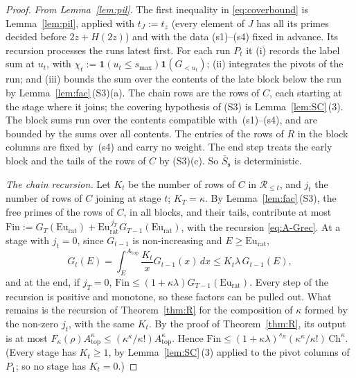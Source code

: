 \begin{proof}
\emph{From Lemma~\ref{lem:pil}.} The first inequality in \eqref{eq:coverbound} is Lemma~\ref{lem:pil}, applied with
$t_J:=t_z$ (every element of $J$ has all its primes decided before $2z+H(2z)$) and with the data (s1)--(s4) fixed in
advance. Its recursion processes the runs latest first. For each run $P_t$ it (i) records the label sum at $u_t$, with
$\chi_t:=\mathbf 1(u_t\le s_{\max})\mathbf 1(G_{<u_t})$; (ii) integrates the pivots of the run; and (iii) bounds the sum
over the contents of the late block below the run by Lemma~\ref{lem:fac}\,(S3)(a). The chain rows are the rows of $C$,
each starting at the stage where it joins; the covering hypothesis of (S3) is Lemma~\ref{lem:SC}\,(3). The block sums
run over the contents compatible with~(s1)--(s4), and are bounded by the sums over all contents. The entries of the rows
of $R$ in the block columns are fixed by~(s4) and carry no weight. The end step treats the early block and the tails of
the rows of $C$ by (S3)(c). So $\bar S_{\mathfrak s}$ is deterministic.

\emph{The chain recursion.} Let $K_t$ be the number of rows of $C$ in $\mathcal R_{\le t}$, and $j_t$ the number of rows of
$C$ joining at stage $t$; $K_T=\kappa$. By Lemma~\ref{lem:fac}\,(S3), the free primes of the rows of $C$, in all blocks,
and their tails, contribute at most $\mathrm{Fin}:=G_T(\mathrm{Eu}_{\mathrm{rat}})+\mathrm{Eu}_{\mathrm{rat}}^{\,j_T}
G_{T-1}(\mathrm{Eu}_{\mathrm{rat}})$, with the recursion \eqref{eq:A-Grec}. At a stage with $j_t=0$, since $G_{t-1}$ is
non-increasing and $E\ge\mathrm{Eu}_{\mathrm{rat}}$,
\[
  G_t(E)=\int_E^{A_{\mathrm{top}}}\frac{K_t}xG_{t-1}(x)\,dx\le K_t\lambda\,G_{t-1}(E),
\]
and at the end, if $j_T=0$, $\mathrm{Fin}\le(1+\kappa\lambda)G_{T-1}(\mathrm{Eu}_{\mathrm{rat}})$. Every step of the
recursion is positive and monotone, so these factors can be pulled out. What remains is the recursion of
Theorem~\ref{thm:R} for the composition of $\kappa$ formed by the non-zero $j_t$, with the same $K_t$. By the proof of
Theorem~\ref{thm:R}, its output is at most $F_\kappa(\rho)A_{\mathrm{top}}^\kappa\le(\kappa^\kappa/\kappa!)A_{\mathrm{top}}^\kappa$.
Hence $\mathrm{Fin}\le(1+\kappa\lambda)^{s_R}(\kappa^\kappa/\kappa!)\,\mathrm{Ch}^\kappa$. (Every stage has $K_t\ge1$, by
Lemma~\ref{lem:SC}\,(3) applied to the pivot columns of $P_1$; so no stage has $K_t=0$.)


\end{proof}
